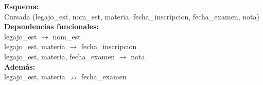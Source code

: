 \documentclass[preview]{standalone}
\begin{document}
\textbf{Esquema:}\\
Cursada (legajo\_est, nom\_est, materia, fecha\_inscripcion, fecha\_examen, nota)\\

\textbf{Dependencias funcionales:}\\
legajo\_est $\rightarrow$ nom\_est\\
legajo\_est, materia $\rightarrow$ fecha\_inscripcion\\
legajo\_est, materia, fecha\_examen $\rightarrow$ nota\\

\textbf{Adem\'as:}\\
legajo\_est, materia $\nrightarrow$ fecha\_examen
\end{document}

